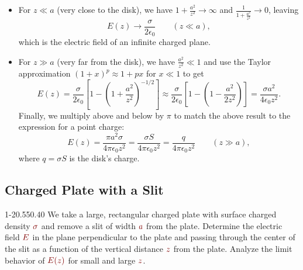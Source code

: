 \documentclass[11pt, a4paper]{article}
\newcommand{\dmath}[1]{\textcolor{Maroon}{#1}}  %
\newcommand{\ee}{\epsilon_{0}}  %
\newcommand{\defaultQuestionWidth}{0.55}
\newcommand{\defaultGraphicsWidth}{0.40}
\begin{document}
\begin{itemize}
	\item For $ z \ll a $ (very close to the disk), we have $ 1 + \frac{a^{2}}{z^{2}} \to \infty $ and $ \frac{1}{1 + \frac{a^{2}}{z^{2}}} \to 0$, leaving \vspace{-2mm}
	\begin{equation*}
		E(z) \to \frac{\sigma}{2\ee} \qquad (z \ll a),
	\end{equation*}
	which is the electric field of an infinite charged plane.
	
	\item For $ z \gg a $ (very far from the disk), we have $ \frac{a^{2}}{z^{2}} \ll 1 $ and use the Taylor approximation $ (1 + x)^{p} \approx 1 + px $ for $ x \ll 1 $ to get
	\begin{equation*}
		E(z) = \frac{\sigma}{2\ee} \left[1 -  \left (1 + \frac{a^{2}}{z^{2}}\right )^{-1/2}\right] \approx \frac{\sigma}{2\ee}\left[ 1 - \left(1 - \frac{a^{2}}{2z^{2}}\right) \right] = \frac{\sigma a^{2}}{4\ee z^{2}}.
	\end{equation*}
	Finally, we multiply above and below by $ \pi $ to match the above result to the expression for a point charge:
	\begin{equation*}
		E(z) = \frac{\pi a^{2} \sigma}{4\pi \ee z^{2}} = \frac{\sigma S}{4\pi \ee z^{2}} = \frac{q}{4\pi \ee z^{2}}  \qquad (z \gg a),
	\end{equation*}
	where $ q = \sigma S $ is the disk's charge. 

\end{itemize}


\subsection{Charged Plate with a Slit}
\begin{figurequestion}{1-2}{\defaultQuestionWidth}{\defaultGraphicsWidth}
    We take a large, rectangular charged plate with surface charged density $ \dmath{\sigma} $ and remove a slit of width $ \dmath{a} $ from the plate. Determine the electric field $ \dmath{E} $ in the plane perpendicular to the plate and passing through the center of the slit as a function of the vertical distance $ \dmath{z} $ from the plate. Analyze the limit behavior of $ \dmath{E(z)} $ for small and large $ \dmath{z} $.
\end{figurequestion}
\end{document}
